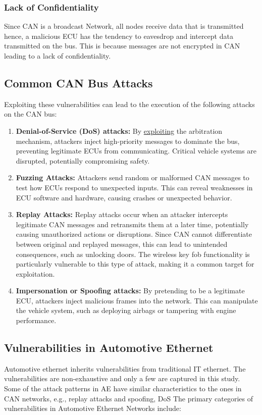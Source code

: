 \documentclass{report}
\begin{document}
\subsubsection{Lack of Confidentiality}
Since CAN is a broadcast Network, all nodes receive data that is transmitted hence, a malicious ECU has the tendency to eavesdrop and intercept data transmitted on the bus. This is because messages are not encrypted in CAN leading to a lack of confidentiality.

\subsection{Common CAN Bus Attacks}
Exploiting these vulnerabilities can lead to the execution of the following attacks on the CAN bus:

\begin{enumerate}
    \item \textbf{Denial-of-Service (DoS) attacks:} By \underline{exploiting} the arbitration mechanism, attackers inject high-priority messages to dominate the bus, preventing legitimate ECUs from communicating. Critical vehicle systems are disrupted, potentially compromising safety.
    \item \textbf{Fuzzing Attacks:} Attackers send random or malformed CAN messages to test how ECUs respond to unexpected inputs. This can reveal weaknesses in ECU software and hardware, causing crashes or unexpected behavior.
    \item \textbf{Replay Attacks:} Replay attacks occur when an attacker intercepts legitimate CAN messages and retransmits them at a later time, potentially causing unauthorized actions or disruptions. Since CAN cannot differentiate between original and replayed messages, this can lead to unintended consequences, such as unlocking doors. The wireless key fob functionality is particularly vulnerable to this type of attack, making it a common target for exploitation.
    \item \textbf{Impersonation or Spoofing attacks:} By pretending to be a legitimate ECU, attackers inject malicious frames into the network. This can manipulate the vehicle system, such as deploying airbags or tampering with engine performance.
\end{enumerate}

\subsection{Vulnerabilities in Automotive Ethernet}
Automotive ethernet inherits vulnerabilities from traditional IT ethernet. The vulnerabilities are non-exhaustive and only a few are captured in this study. Some of the attack patterns in AE have similar characteristics to the ones in CAN networks, e.g., replay attacks and spoofing, DoS
The primary categories of vulnerabilities in Automotive Ethernet Networks include:
\end{document}

